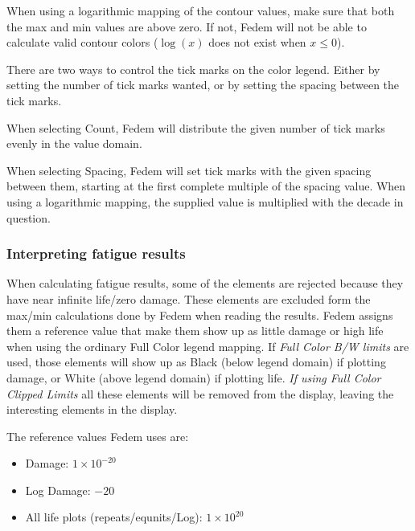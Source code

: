 When using a logarithmic mapping of the contour values, make sure that both the
max and min values are above zero. If not, Fedem will not be able to calculate
valid contour colors ($\log(x)$ does not exist when $x\leq0$).


There are two ways to control the tick marks on the color legend.
Either by setting the number of tick marks wanted, or by setting the spacing
between the tick marks.

When selecting Count, Fedem will distribute the given number of tick marks
evenly in the value domain.

When selecting Spacing, Fedem will set tick marks with the given spacing between
them, starting at the first complete multiple of the spacing value.
When using a logarithmic mapping, the supplied value is multiplied with the
decade in question.


\subsubsection{Interpreting fatigue results}

When calculating fatigue results, some of the elements are rejected because they
have near infinite life/zero damage. These elements are excluded form the
max/min calculations done by Fedem when reading the results.
Fedem assigns them a reference value that make them show up as little damage or
high life when using the ordinary Full Color legend mapping.
If {\sl Full Color B/W limits} are used, those elements will show up as Black
(below legend domain) if plotting damage, or White (above legend domain) if
plotting life. {\sl If using Full Color Clipped Limits} all these elements will
be removed from the display, leaving the interesting elements in the display.

The reference values Fedem uses are:

\begin{itemize}
\item Damage: $1\times10^{-20}$
\item Log Damage: $-20$
\item All life plots (repeats/equnits/Log): $1\times10^{20}$
\end{itemize}



